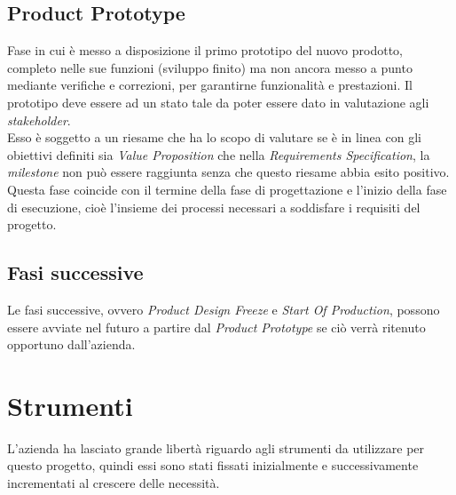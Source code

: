 \subsection{Product Prototype}
Fase in cui è messo a disposizione il primo prototipo del nuovo prodotto, completo nelle sue funzioni (sviluppo finito) ma non ancora messo a punto mediante verifiche e correzioni, per garantirne funzionalità e prestazioni. Il prototipo deve essere ad un stato tale da poter essere dato in valutazione agli \emph{stakeholder}.\\
Esso è soggetto a un riesame che ha lo scopo di valutare se è in linea con gli obiettivi definiti sia \emph{Value Proposition} che nella \emph{Requirements Specification}, la \emph{milestone} non può essere raggiunta senza che questo riesame abbia esito positivo.\\
Questa fase coincide con il termine della fase di progettazione e l'inizio della fase di esecuzione, cioè l'insieme dei processi necessari a soddisfare i requisiti del progetto.

\subsection{Fasi successive}
Le fasi successive, ovvero \emph{Product Design Freeze} e \emph{Start Of Production}, possono essere avviate nel futuro a partire dal \emph{Product Prototype} se ciò verrà ritenuto opportuno dall'azienda.



\section{Strumenti}
L'azienda ha lasciato grande libertà riguardo agli strumenti da utilizzare per questo progetto, quindi essi sono stati fissati inizialmente e successivamente incrementati al crescere delle necessità.

